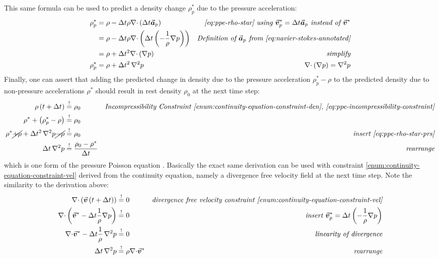 \documentclass[oneside, a4paper]{book}
\newcommand*\Laplace{\mathop{}\!\mathbin\nabla^2}
\newcommand\vek[1]{\vec{\bm{#1}}}
\newcommand\br[1]{\left(#1\right)}
\newcommand\divergence{{\nabla\cdot}}
\begin{document}
    This same formula can be used to predict a density change $\rho_p^*$ due to the pressure acceleration:
    \begin{align}
      \rho_p^* &= \rho - \Delta t \rho \divergence \br{\Delta t\vek{a}_p} &\textit{\autoref{eq:ppe-rho-star} using $\vek{v}^*_p = \Delta t \vek{a}_p$ instead of $\vek{v}^*$}\\
      &= \rho - \Delta t \rho \divergence \br{\Delta t\br{-\frac{1}{\rho}\nabla p}} &\textit{Definition of $\vek{a}_p$ from \autoref{eq:navier-stokes-annotated}}\\
      &= \rho + \Delta t^2 \divergence \br{\nabla p} &\textit{simplify}\\
      \rho_p^* &= \rho + \Delta t^2 \Laplace p &\textit{$\divergence \br{\nabla p} = \Laplace p$}\label{eq:ppe-rho-star-prs}
    \end{align}
    Finally, one can assert that adding the predicted change in density due to the pressure acceleration $\rho_p^* - \rho$ to the predicted density due to non-pressure accelerations $\rho^*$ should result in rest density $\rho_0$ at the next time step:
    \begin{align}
      \rho\br{t+\Delta t} &\overset{!}{=} \rho_0 &\textit{Incompressibility Constraint \ref{enum:continuity-equation-constraint-den}, \autoref{eq:ppe-incompressibility-constraint}}\\
      \rho^* + \br{\rho_p^* - \rho} &\overset{!}{=} \rho_0 &\\
      \rho^* \cancel{+ \rho} + \Delta t^2 \Laplace p \cancel{- \rho} &\overset{!}{=} \rho_0 &\textit{insert \autoref{eq:ppe-rho-star-prs}}\\
      \Delta t \Laplace p &\overset{!}{=}\frac{\rho_0-\rho^*}{\Delta t} &\textit{rearrange}\label{eq:iisph-density-source-ppe}
    \end{align}
    which is one form of the pressure Poisson equation \autocite{tutorial2019}. 
    Basically the exact same derivation can be used with constraint \ref{enum:continuity-equation-constraint-vel} derived from the continuity equation, namely a divergence free velocity field at the next time step. Note the similarity to the derivation above:
    \begin{align}
      \divergence\br{\vek{v}\br{t+\Delta t}} &\overset{!}{=} 0&\textit{divergence free velocity constraint \ref{enum:continuity-equation-constraint-vel}}\\
      \divergence\br{\vek{v}^* - \Delta t \frac{1}{\rho}\nabla p} &\overset{!}{=} 0 &\textit{insert $\vek{v}_p^*=\Delta t \br{- \frac{1}{\rho}\nabla p}$}\\
      \divergence\vek{v}^* - \Delta t \frac{1}{\rho}\Laplace p &\overset{!}{=} 0 & \textit{linearity of divergence}\\\label{eq:velocity-divergence-source-ppe}
      \Delta t \Laplace p&\overset{!}{=} \rho \divergence\vek{v}^* &\textit{rearrange}
    \end{align}
\end{document}
